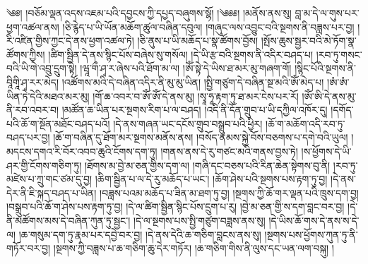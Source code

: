 ༄༅། །བཅོམ་ལྡན་འདས་འཇམ་པའི་དབྱངས་ཀྱི་དཔྱད་བཞུགས་སྷོ། །༄༅༅། །མནོས་ནས་སུ། བླ་མ་དེ་ལ་གུས་པར་ཕྱག་འཚལ་ནས། །ཅི་རྙེད་པ་ཡི་ཡོན་མཆོག་ཚུལ་བཞིན་དབུལ། །གཞུང་ལས་འབྱུང་བའི་སྔགས་ནི་བཟླས་པར་བྱ། །རི་འཛིན་གྱིས་ཀྱང་དེ་ནས་ཕྱག་འཚལ་ཏེ། །ཅི་ནུས་པ་ཡི་མཆོད་པ་སྣ་ཚོགས་བྱོས། །སྤོས་ཆུས་སྦྱར་བའི་མེ་ཏོག་སྣ་ཚོགས་ཀྱིས། །ཚིག་སྦྱིན་དེ་ནས་སྙིང་པོས་བཞེས་སུ་གསོལ། །དེ་ཡི་རྩ་བའི་སྔགས་ནི་འདིར་བཤད་པ། །རབ་ཏུ་གསང་བའི་ཡི་གེ་འབྲུ་དྲུག་སྟེ། །ཝཱ་གྀ་ཤྭ་ར་ཞེས་པའི་ཐོག་མ་ལ། །ཨོཾ་སྟེ་དེ་ཡིས་ཐ་མར་མུ་གཞག་གོ། །སྙིང་པོའི་སྔགས་ནི་བཱིགཱི་ཤྭ་རར་མེད། །འཚོགས་མའི་དེ་བཞིན་འདིར་ནི་མུ་མུ་ཡིན། །སྤྱི་གཙུག་དེ་བཞིན་སྔ་མའི་ཨོཾ་མེད་པ། །ཨཾ་ཨཾ་ཡིན་ཏེ་དེའི་མཐའ་མར་མུ། །གོ་ཆ་འབར་བ་ཨོཾ་ཨོཾ་དེ་ནས་མུ། །སྭཱ་ཧཱ་རྟག་ཏུ་ཐ་མར་ངེས་པར་རོ། །ཨོཾ་ཨི་དེ་ནས་མུ་ནི་རབ་འབར་བ། །མཚོན་ཆ་ཡིན་པར་སྔགས་རིག་པ་ལ་བཤད། །འདི་ནི་དོན་གྲུབ་པ་ཡི་དཀྱིལ་འཁོར་དུ། །དགོད་པའི་ཆོ་ག་སྔོན་མཐོང་བཤད་པའོ། །དེ་ནས་གཞན་ཡང་དངོས་གྲུབ་བསྒྲུབ་པའི་ཕྱིར། །ཆོ་ག་མཆོག་འདི་རབ་ཏུ་བཤད་པར་བྱ། །ཆོ་ག་བཞིན་དུ་ཐོག་མར་སྔགས་མནོས་ནས། །བསོད་ནམས་སྐྱེ་བོས་བཅགས་པ་དགེ་བའི་ཡུལ། །མདངས་དགའ་རི་བོར་འབབ་ཆུའི་ངོགས་དག་ཏུ། །གནས་ནས་དེ་རུ་གཙང་མའི་གནས་བྱས་ཏེ། །ས་ཕྱོགས་དེ་ཡི་ཤར་གྱི་ངོགས་གཅིག་ཏུ། །ཐོགས་མ་བྱེ་མ་ཅན་གྱིས་དག་ལ། །གཞི་དང་བཅས་པའི་རིན་ཆེན་སྟེགས་བུ་ནི། །རབ་ཏུ་མཛེས་པ་ཀྲུ་གང་ཙམ་དུ་བྱ། །ཆིག་སྦྱིན་པ་ལ་དེ་རུ་མཆོད་པ་ཡང་། །ཆོག་ཤེས་པའི་སྔགས་པས་རྟག་ཏུ་བྱ། །དེ་ནས་དེར་ནི་ཇི་སྐད་བཤད་པ་ཡིན། །བཟླས་པའམ་མཆོད་པ་ཟིན་མ་ཐག་ཏུ་བྱ། །སྔགས་ཀྱི་ཆོ་གར་ལྡན་པའི་ཁྲུས་དག་བྱ། །བསྒྲུབ་པའི་ཆོ་ག་ཤེས་པས་རྟག་ཏུ་བྱ། །དེ་ལ་ཚིག་སྦྱིན་སྙིང་པོས་དྲུག་པ་རུ། །བྱེ་མ་ཅན་གྱི་ས་དག་བླང་བར་བྱ། །དེ་ནི་མཚོགས་མས་དེ་བཞིན་ཀུན་ཏུ་སྦྱང་། །དེ་ལ་སྔགས་པས་སྤྱི་གཙུག་བཟླས་ནས་སུ། །དེ་ཡིས་ཆོ་གས་དེ་ནས་ས་དེ་ལ། །ཆ་གསུམ་དག་ཏུ་རྣམ་པར་དབྱེ་བར་བྱ། །དེ་ནས་དེའི་ཆ་གཅིག་བླངས་ནས་སུ། །སྔགས་པས་ཕྱོགས་ཀུན་ཏུ་ནི་གཏོར་བར་བྱ། །སྔགས་ཀྱི་བཟླས་པ་ཆ་གཅིག་ཆུ་དེར་གཏོར། །ཆ་གཅིག་གིས་ནི་ལུས་དང་ཡན་ལག་བསྐུ། །
